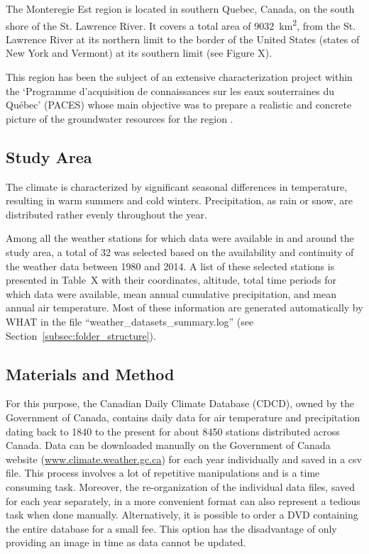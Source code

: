\documentclass[TechnicalNoteMeteo.tex]{subfiles}
\begin{document}
The Monteregie Est region is located in southern Quebec, Canada, on the south shore of the St. Lawrence River. It covers a total area of \SI{9032}{km^2}, from the St. Lawrence River at its northern limit to the border of the United States (states of New York and Vermont) at its southern limit (see Figure X).

This region has been the subject of an extensive characterization project within the `Programme d'acquisition de connaissances sur les eaux souterraines du Québec' (PACES) whose main objective was to prepare a realistic and concrete picture of the groundwater resources for the region \citep{carrier_portrait_2013}.

\subsection{Study Area}

The climate is characterized by significant seasonal differences in temperature, resulting in warm summers and cold winters. Precipitation, as rain or snow, are distributed rather evenly throughout the year.

Among all the weather stations for which data were available in and around the study area, a total of 32 was selected based on the availability and continuity of the weather data between 1980 and 2014. A list of these selected stations is presented in Table~X with their coordinates, altitude, total time periods for which data were available, mean annual cumulative precipitation, and mean annual air temperature. Most of these information are generated automatically by WHAT in the file ``weather\_datasets\_summary.log'' (see Section~\ref{subsec:folder_structure}).

\subsection{Materials and Method}


For this purpose, the Canadian Daily Climate Database (CDCD), owned by the Government of Canada, contains daily data for air temperature and precipitation dating back to 1840 to the present for about 8450 stations distributed across Canada. Data can be downloaded manually on the Government of Canada website (\url{www.climate.weather.gc.ca}) for each year individually and saved in a csv file. This process involves a lot of repetitive manipulations and is a time consuming task. Moreover, the re-organization of the individual data files, saved for each year separately, in a more convenient format can also represent a tedious task when done manually. Alternatively, it is possible to order a DVD containing the entire database for a small fee. This option has the disadvantage of only providing an image in time as data cannot be updated.  
\end{document}
